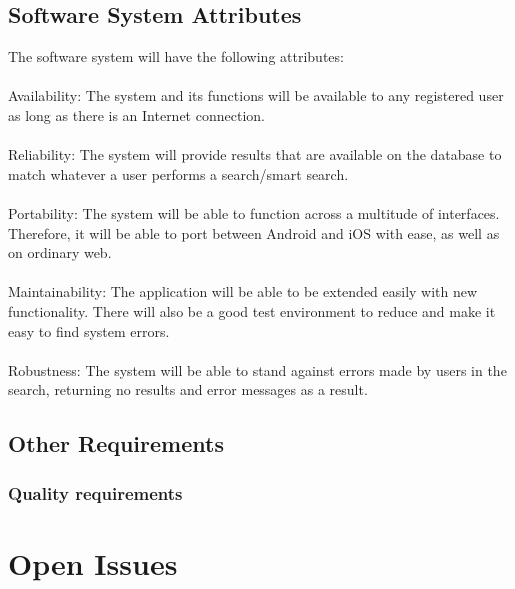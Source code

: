\documentclass[a4paper,10pt]{article}
\begin{document}
{	\subsection{Software System Attributes}
	{The software system will have the following attributes:
\\\\
		Availability: The system and its functions will be available to any registered user as long as there is an Internet connection. 
\\\\
		Reliability: The system will provide results that are available on the database to match whatever a user performs a search/smart search.
\\\\
		Portability: The system will be able to function across a multitude of interfaces. Therefore, it will be able to port between Android and iOS with ease, as well as on ordinary web. 
\\\\
		Maintainability: The application will be able to be extended easily with new functionality. There will also be a good test environment to reduce and make it easy to find system errors.  
\\\\
		Robustness: The system will be able to stand against errors made by users in the search, returning no results and error messages as a result.}
        
	\subsection{Other Requirements}

\subsubsection{Quality requirements}

\clearpage

\section{Open Issues}
}
\end{document}
